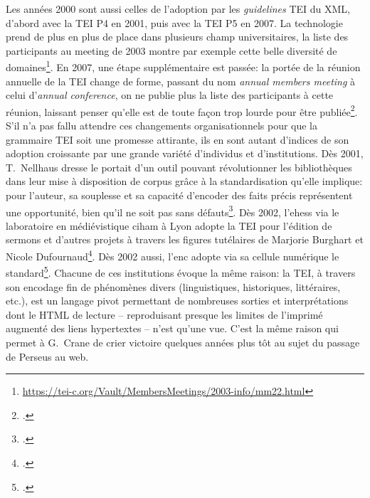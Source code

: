 Les années 2000 sont aussi celles de l'adoption par les \textit{guidelines} TEI du XML, d'abord avec la TEI P4 en 2001, puis avec la TEI P5 en 2007. La technologie prend de plus en plus de place dans plusieurs champ universitaires, la liste des participants au meeting de 2003 montre par exemple cette belle diversité de domaines\footnote{\url{https://tei-c.org/Vault/MembersMeetings/2003-info/mm22.html}}. En 2007, une étape supplémentaire est passée: la portée de la réunion annuelle de la TEI change de forme, passant du nom \textit{annual members meeting} à celui d'\textit{annual conference}, on ne publie plus la liste des participants à cette réunion, laissant penser qu'elle est de toute façon trop lourde pour être publiée\footcite{noauthor_members_nodate}. S'il n'a pas fallu attendre ces changements organisationnels pour que la grammaire TEI soit une promesse attirante, ils en sont autant d'indices de son adoption croissante par une grande variété d'individus et d'institutions. Dès 2001, T.~Nellhaus dresse le portait d'un outil pouvant révolutionner les bibliothèques dans leur mise à disposition de corpus grâce à la standardisation qu'elle implique: pour l'auteur, sa souplesse et sa capacité d'encoder des faits précis représentent une opportunité, bien qu'il ne soit pas sans défauts\footcite{nellhaus_xml_2001}. Dès 2002, l'\acrfull{ehess} via le laboratoire en médiévistique  \acrfull{ciham} à Lyon adopte la TEI pour l'édition de sermons et d'autres projets à travers les figures tutélaires de Marjorie Burghart et Nicole Dufournaud\footcite{burghart_edition_2011}. Dès 2002 aussi, l'\acrfull{enc} adopte via sa cellule numérique le standard\footcite{poupeau_les_2006}. Chacune de ces institutions évoque la même raison: la TEI, à travers son encodage fin de phénomènes divers (linguistiques, historiques, littéraires, etc.), est un langage pivot permettant de nombreuses sorties et interprétations dont le HTML de lecture -- reproduisant presque les limites de l'imprimé augmenté des liens hypertextes -- n'est qu'une vue. C'est la même raison qui permet à G.~Crane de crier victoire quelques années plus tôt au sujet du passage de Perseus au web.


